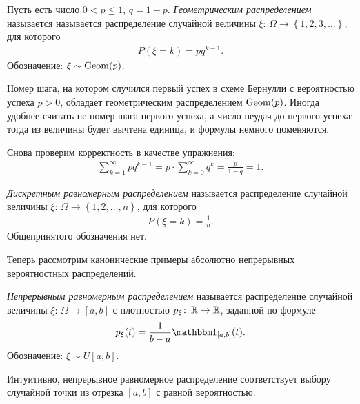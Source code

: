 \documentclass[../main.tex]{subfiles}
\begin{document}
\begin{exmpl}
 Пусть есть число $ 0 < p \leqslant 1 $, $ q = 1-p $. \textit{Геометрическим распределением} называется называется распределение случайной величины $ \xi \colon\,\Omega \to \left\{ 1,2,3,\ldots \right\} $, для которого
 \begin{align*}
  P(\xi = k) = pq^{k-1}.
 \end{align*} Обозначение: $ \xi \sim \mathrm{Geom}(p) $.

 Номер шага, на котором случился первый успех в схеме Бернулли с вероятностью успеха $ p > 0$, обладает геометрическим распределением $ \mathrm{Geom}(p) $. Иногда удобнее считать не номер шага первого успеха, а число неудач до первого успеха: тогда из величины будет вычтена единица, и формулы немного поменяются.

 Снова проверим корректность в качестве упражнения:
 \begin{align*}
  \sum_{k=1}^{\infty} pq^{k-1} = p \cdot \sum_{k=0}^{\infty} q^{k} = \frac{p}{1 - q} = 1.
 \end{align*} 
\end{exmpl}

\begin{exmpl}
 \textit{Дискретным равномерным распределением} называется распределение случайной величины $ \xi\colon\,\Omega\to \left\{ 1,2,\ldots,n \right\} $, для которого
 \begin{align*}
  P(\xi = k) = \frac{1}{n}.
 \end{align*} Общепринятого обозначения нет.
\end{exmpl}

Теперь рассмотрим канонические примеры абсолютно непрерывных вероятностных распределений.

\begin{exmpl}
 \textit{Непрерывным равномерным распределением} называется распределение случайной величины $ \xi\colon\,\Omega \to [a,b] $ с плотностью $ p_\xi \colon\,\mathbb{R}\to\mathbb{R} $, заданной по формуле
 \begin{align*}
  p_\xi(t) = \frac{1}{b-a}\Ind_{[a,b]}(t).
 \end{align*} Обозначение: $ \xi \sim U[a,b] $.

 Интуитивно, непрерывное равномерное распределение соответствует выбору случайной точки из отрезка $ [a,b] $ с равной вероятностью.
\end{exmpl}
\end{document}
